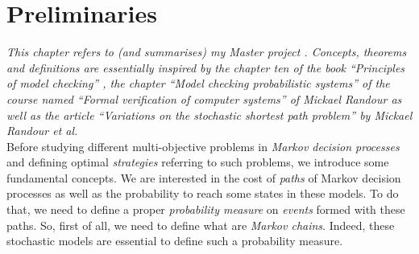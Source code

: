 \chapter{Preliminaries} \label{preliminaries}
\textit{This chapter refers to (and summarises) my Master project \cite{Flo2017}. Concepts, theorems and definitions are essentially inspired by the chapter ten of the book ``Principles of model checking'' \cite{PMC}, the chapter ``Model checking probabilistic systems'' of the course named ``Formal verification of computer systems'' of Mickael Randour \cite{MRV} as well as the article ``Variations on the stochastic shortest path problem'' \cite{DBLP:journals/corr/RandourRS14a} by Mickael Randour et al.} \\

Before studying different multi-objective problems in \textit{Markov decision
processes} and defining optimal \textit{strategies} referring to such problems, we introduce some fundamental concepts. We are interested in the cost of \textit{paths} of Markov decision processes as well as the probability to reach some states in these models.
To do that, we need to define a proper \textit{probability measure} on \textit{events} formed with these paths.
So, first of all, we need to define what are \textit{Markov chains}.
Indeed, these stochastic models are essential to define such a probability measure.

